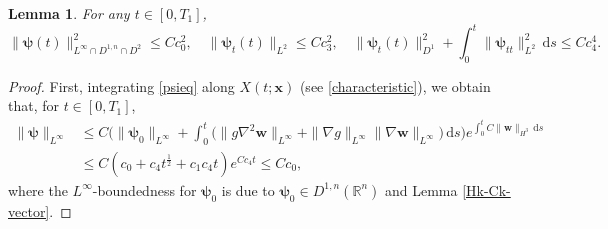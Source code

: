 \documentclass[11pt,reqno]{amsart}
\newtheorem{lem}{Lemma}[section]
\numberwithin{rk}{section}
\numberwithin{prop}{section}
\numberwithin{mydef}{section}
\numberwithin{lem}{section}
\numberwithin{equation}{section}
\numberwithin{thm}{section}
\begin{document}
\begin{lem}\label{psi} 
For any $t\in [0, T_1]$, 
\begin{equation*}
\|\boldsymbol{\psi}(t)\|^2_{L^\infty\cap D^{1,n}\cap D^2}\leq Cc_0^2,\quad\|\boldsymbol{\psi}_t(t)\|_{L^2}\leq Cc_3^2,
\quad \|\boldsymbol{\psi}_t(t)\|^2_{D^1}+\int^t_0\|\boldsymbol{\psi}_{tt}\|^2_{L^2}\,\mathrm{d}s\leq Cc_4^4.
\end{equation*}
\end{lem}
\begin{proof} 
First,  integrating \eqref{psieq} along $X(t; \boldsymbol{x})$ (see \eqref{characteristic}), we obtain that, for $t\in [0, T_1]$,
\begin{equation}\label{inftypsi}
\begin{aligned}
\|\boldsymbol{\psi}\|_{L^\infty}&\leq C\Big(\|\boldsymbol{\psi}_0\|_{L^\infty}+\int_0^t\big(\|g\nabla^2 \boldsymbol{w}\|_{L^\infty}+\|\nabla g\|_{L^\infty} \|\nabla \boldsymbol{w}\|_{L^\infty}\big) \,\mathrm{d}s\Big)e^{ \int_0^tC\|\boldsymbol{w}\|_{H^3} \,\mathrm{d}s} \\
& \leq C(c_0+c_4t^{\frac{1}{2}}+c_1c_4 t)e^{Cc_4t}\leq Cc_0,         
\end{aligned}
\end{equation}
where the $L^\infty$-boundedness for $\boldsymbol{\psi}_0$ is due to $\boldsymbol{\psi}_0\in D^{1,n}(\mathbb{R}^n)$ and Lemma \ref{Hk-Ck-vector}.





\end{proof}
\end{document}
